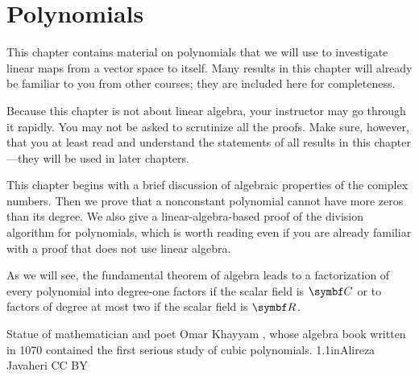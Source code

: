 
\chapter{Polynomials} \label{polynomials}  %

This chapter contains material on polynomials that we will use to investigate linear maps from a vector space to itself.  Many results in this chapter will already be familiar to you from other courses; they are included here for completeness.

Because this chapter is not about linear algebra,  your instructor may go
through it rapidly.  You may not be asked to scrutinize all the proofs.
Make sure, however, that you at least read and  understand the statements of
all results in this chapter---they will be used in later chapters.

This chapter begins with a brief discussion of algebraic properties of the complex numbers. Then we prove that a nonconstant polynomial cannot have more zeros than its degree. We also give a linear-algebra-based proof of the division algorithm for polynomials, which is worth reading even if you are already familiar with a proof that does not use linear algebra.

As we will see, the fundamental theorem of algebra leads to a factorization of every polynomial into degree-one factors if the scalar field is $\C{}$ or to factors of degree at most two if the scalar field is $\R{}$.

%
{Statue of mathematician and poet Omar Khayyam , whose algebra
book written in 1070 contained the first serious study of cubic \mbox{polynomials}.}%
{1.1in}{Alireza Javaheri CC BY}


